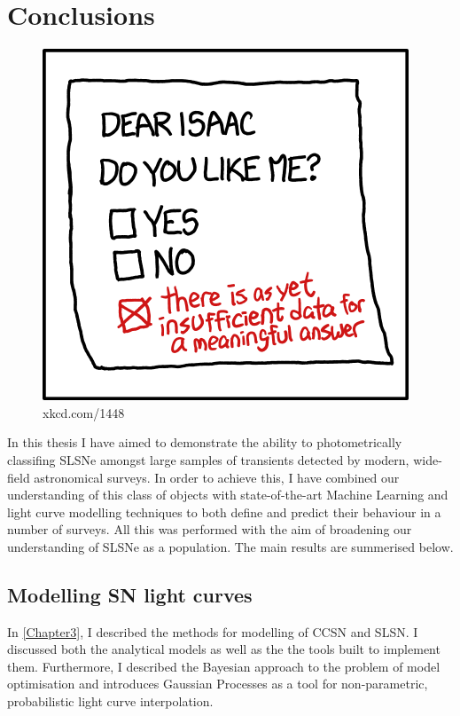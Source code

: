 \chapter{Conclusions}
\label{Chapter6}

\begin{figure}[H]
  \centering
  \includegraphics{Figures/xkcd/chapter6.png}
  \caption*{xkcd.com/1448}
\end{figure}

In this thesis I have aimed to demonstrate the ability to photometrically classifing SLSNe amongst large samples of transients detected by modern, wide-field astronomical surveys. In order to achieve this, I have combined our understanding of this class of objects with state-of-the-art Machine Learning and light curve modelling techniques to both define and predict their behaviour in a number of surveys. All this was performed with the aim of broadening our understanding of SLSNe as a population. The main results are summerised below.

\section{Modelling SN light curves}
In \cref{Chapter3}, I described the methods for modelling of CCSN and SLSN. I discussed both the analytical models as well as the the tools built to implement them. Furthermore, I described the Bayesian approach to the problem of model optimisation and introduces Gaussian Processes as a tool for non-parametric, probabilistic light curve interpolation.


